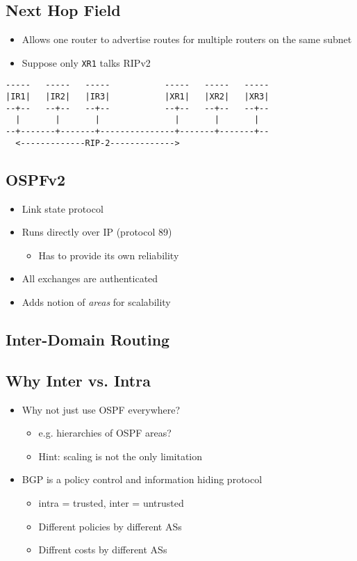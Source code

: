 \subsection{Next Hop Field}
\begin{itemize}[nosep]
    \item Allows one router to advertise routes for multiple routers on the same subnet
    \item Suppose only \texttt{XR1} talks RIPv2
\end{itemize}
\begin{verbatim}
-----   -----   -----           -----   -----   -----
|IR1|   |IR2|   |IR3|           |XR1|   |XR2|   |XR3|
--+--   --+--   --+--           --+--   --+--   --+--
  |       |       |               |       |       |
--+-------+-------+---------------+-------+-------+--
  <-------------RIP-2------------->
\end{verbatim}
\subsection{OSPFv2}
\begin{itemize}[nosep]
    \item Link state protocol
    \item Runs directly over IP (protocol 89)
          \begin{itemize}[nosep]
              \item Has to provide its own reliability
          \end{itemize}
    \item All exchanges are authenticated
    \item Adds notion of \emph{areas} for scalability
\end{itemize}
\subsection{Inter-Domain Routing}
\subsection{Why Inter vs. Intra}
\begin{itemize}[nosep]
    \item Why not just use OSPF everywhere?
          \begin{itemize}[nosep]
              \item e.g. hierarchies of OSPF areas?
              \item Hint: scaling is not the only limitation
          \end{itemize}
    \item BGP is a policy control and information hiding protocol
          \begin{itemize}[nosep]
              \item intra = trusted, inter = untrusted
              \item Different policies by different ASs
              \item Diffrent costs by different ASs
          \end{itemize}
\end{itemize}
